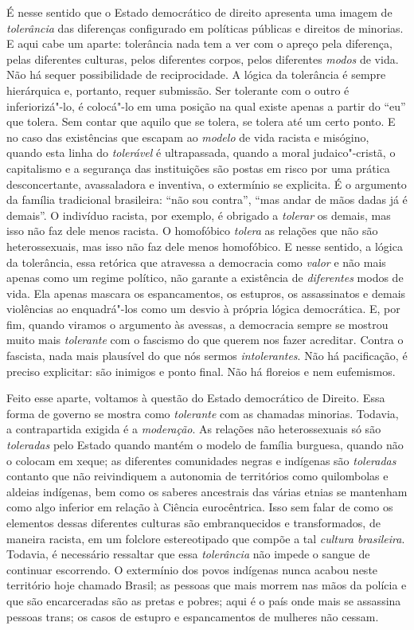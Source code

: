 É nesse sentido que o Estado democrático de direito apresenta uma imagem
de \emph{tolerância} das diferenças configurado em políticas públicas e
direitos de minorias. E aqui cabe um aparte: tolerância nada tem a ver
com o apreço pela diferença, pelas diferentes culturas, pelos diferentes
corpos, pelos diferentes \emph{modos} de vida. Não há sequer
possibilidade de reciprocidade. A lógica da tolerância é sempre
hierárquica e, portanto, requer submissão. Ser tolerante com o outro é
inferiorizá"-lo, é colocá"-lo em uma posição na qual existe apenas a
partir do ``eu'' que tolera. Sem contar que aquilo que se tolera, se
tolera até um certo ponto. E no caso das existências que escapam ao
\emph{modelo} de vida racista e misógino, quando esta linha do
\emph{tolerável} é ultrapassada, quando a moral judaico"-cristã, o
capitalismo e a segurança das instituições são postas em risco por uma
prática desconcertante, avassaladora e inventiva, o extermínio se
explicita. É o argumento da família tradicional brasileira: ``não sou
contra'', ``mas andar de mãos dadas já é demais''. O indivíduo racista,
por exemplo, é obrigado a \emph{tolerar} os demais, mas isso não faz
dele menos racista. O homofóbico \emph{tolera} as relações que não são
heterossexuais, mas isso não faz dele menos homofóbico. E nesse sentido,
a lógica da tolerância, essa retórica que atravessa a democracia como
\emph{valor} e não mais apenas como um regime político, não garante a
existência de \emph{diferentes} modos de vida. Ela apenas mascara os
espancamentos, os estupros, os assassinatos e demais violências ao
enquadrá"-los como um desvio à própria lógica democrática. E, por fim,
quando viramos o argumento às avessas, a democracia sempre se mostrou
muito mais \emph{tolerante} com o fascismo do que querem nos fazer
acreditar. Contra o fascista, nada mais plausível do que nós sermos
\emph{intolerantes}. Não há pacificação, é preciso explicitar: são
inimigos e ponto final. Não há floreios e nem eufemismos.

Feito esse aparte, voltamos à questão do Estado democrático de Direito.
Essa forma de governo se mostra como \emph{tolerante} com as chamadas
minorias. Todavia, a contrapartida exigida é a \emph{moderação}. As
relações não heterossexuais só são \emph{toleradas} pelo Estado quando
mantém o modelo de família burguesa, quando não o colocam em xeque; as
diferentes comunidades negras e indígenas são \emph{toleradas} contanto
que não reivindiquem a autonomia de territórios como quilombolas e
aldeias indígenas, bem como os saberes ancestrais das várias etnias se
mantenham como algo inferior em relação à Ciência eurocêntrica. Isso sem
falar de como os elementos dessas diferentes culturas são embranquecidos
e transformados, de maneira racista, em um folclore estereotipado que
compõe a tal \emph{cultura brasileira}. Todavia, é necessário ressaltar
que essa \emph{tolerância} não impede o sangue de continuar escorrendo.
O extermínio dos povos indígenas nunca acabou neste território hoje
chamado Brasil; as pessoas que mais morrem nas mãos da polícia e que são
encarceradas são as pretas e pobres; aqui é o país onde mais se
assassina pessoas trans; os casos de estupro e espancamentos de mulheres
não cessam.

